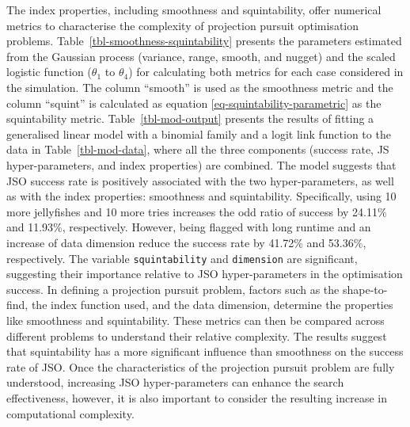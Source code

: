 \documentclass[
  number,
  preprint,
  3p]{elsarticle}
\begin{document}
The index properties, including smoothness and squintability, offer
numerical metrics to characterise the complexity of projection pursuit
optimisation problems. Table~\ref{tbl-smoothness-squintability} presents
the parameters estimated from the Gaussian process (variance, range,
smooth, and nugget) and the scaled logistic function (\(\theta_1\) to
\(\theta_4\)) for calculating both metrics for each case considered in
the simulation. The column ``smooth'' is used as the smoothness metric
and the column ``squint'' is calculated as equation
\ref{eq-squintability-parametric} as the squintability metric.
Table~\ref{tbl-mod-output} presents the results of fitting a generalised
linear model with a binomial family and a logit link function to the
data in Table~\ref{tbl-mod-data}, where all the three components
(success rate, JS hyper-parameters, and index properties) are combined.
The model suggests that JSO success rate is positively associated with
the two hyper-parameters, as well as with the index properties:
smoothness and squintability. Specifically, using 10 more jellyfishes
and 10 more tries increases the odd ratio of success by 24.11\% and
11.93\%, respectively. However, being flagged with long runtime and an
increase of data dimension reduce the success rate by 41.72\% and
53.36\%, respectively. The variable \texttt{squintability} and
\texttt{dimension} are significant, suggesting their importance relative
to JSO hyper-parameters in the optimisation success. In defining a
projection pursuit problem, factors such as the shape-to-find, the index
function used, and the data dimension, determine the properties like
smoothness and squintability. These metrics can then be compared across
different problems to understand their relative complexity. The results
suggest that squintability has a more significant influence than
smoothness on the success rate of JSO. Once the characteristics of the
projection pursuit problem are fully understood, increasing JSO
hyper-parameters can enhance the search effectiveness, however, it is
also important to consider the resulting increase in computational
complexity.
\end{document}
